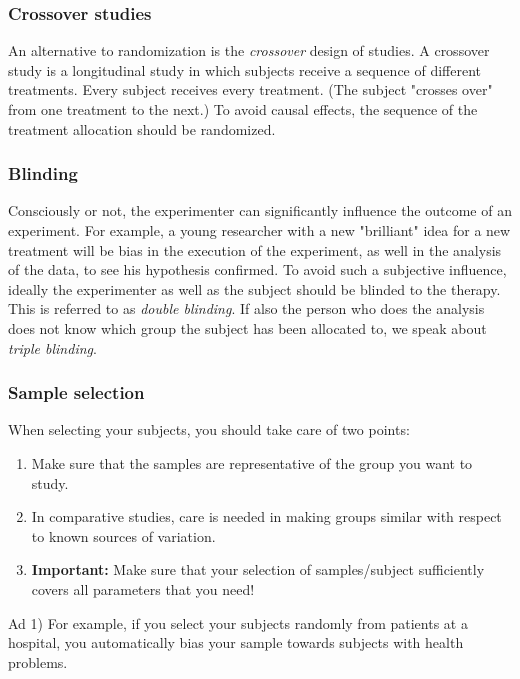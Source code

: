 \subsubsection{Crossover studies} 
An alternative to randomization is the \emph{crossover} design of studies. A crossover study is a longitudinal study in which subjects receive a sequence of different treatments. Every subject receives every treatment. (The subject "crosses over" from one treatment to the next.) To avoid causal effects, the sequence of the treatment allocation should be randomized.

\subsubsection{Blinding} 
Consciously or not, the experimenter can significantly influence the outcome of an experiment. For example, a young researcher with a new "brilliant" idea for a new treatment will be bias in the execution of the experiment, as well in the analysis of the data, to see his hypothesis confirmed. To avoid such a subjective influence, ideally the experimenter as well as the subject should be blinded to the therapy. This is referred to as \emph{double blinding}. If also the person who does the analysis does not know which group the subject has been allocated to, we speak about \emph{triple blinding}.

\subsubsection{Sample selection} 
When selecting your subjects, you should take care of two points:

\begin{enumerate}
  \item Make sure that the samples are representative of the group you want to study.
  \item In comparative studies, care is needed in making groups similar with respect to known sources of variation.
  \item \textbf{Important:} Make sure that your selection of samples/subject sufficiently covers all parameters that you need!
\end{enumerate}

Ad 1) For example, if you select your subjects randomly from patients at a hospital, you automatically bias your sample towards subjects with health problems.

